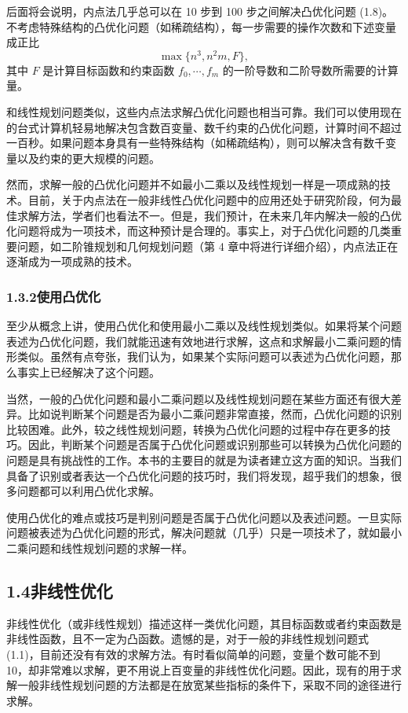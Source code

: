 \documentclass[UTF8, 12pt, fontset=fandol, oneside]{ctexart}
\begin{document}
后面将会说明，内点法几乎总可以在 10 步到 100 步之间解决凸优化问题 (1.8)。不考虑特殊结构的凸优化问题（如稀疏结构），每一步需要的操作次数和下述变量成正比
\[
  \max\{n^3,n^2m,F\},
\]
其中 $F$ 是计算目标函数和约束函数 $f_0,\cdots,f_m$ 的一阶导数和二阶导数所需要的计算量。

和线性规划问题类似，这些内点法求解凸优化问题也相当可靠。我们可以使用现在的台式计算机轻易地解决包含数百变量、数千约束的凸优化问题，计算时间不超过一百秒。如果问题本身具有一些特殊结构（如稀疏结构），则可以解决含有数千变量以及约束的更大规模的问题。

然而，求解一般的凸优化问题并不如最小二乘以及线性规划一样是一项成熟的技术。目前，关于内点法在一般非线性凸优化问题中的应用还处于研究阶段，何为最佳求解方法，学者们也看法不一。但是，我们预计，在未来几年内解决一般的凸优化问题将成为一项技术，而这种预计是合理的。事实上，对于凸优化问题的几类重要问题，如二阶锥规划和几何规划问题（第 4 章中将进行详细介绍），内点法正在逐渐成为一项成熟的技术。

\subsubsection*{1.3.2\quad 使用凸优化}

至少从概念上讲，使用凸优化和使用最小二乘以及线性规划类似。如果将某个问题表述为凸优化问题，我们就能迅速有效地进行求解，这点和求解最小二乘问题的情形类似。虽然有点夸张，我们认为，如果某个实际问题可以表述为凸优化问题，那么事实上已经解决了这个问题。

当然，一般的凸优化问题和最小二乘问题以及线性规划问题在某些方面还有很大差异。比如说判断某个问题是否为最小二乘问题非常直接，然而，凸优化问题的识别比较困难。此外，较之线性规划问题，转换为凸优化问题的过程中存在更多的技巧。因此，判断某个问题是否属于凸优化问题或识别那些可以转换为凸优化问题的问题是具有挑战性的工作。本书的主要目的就是为读者建立这方面的知识。当我们具备了识别或者表达一个凸优化问题的技巧时，我们将发现，超乎我们的想象，很多问题都可以利用凸优化求解。

使用凸优化的难点或技巧是判别问题是否属于凸优化问题以及表述问题。一旦实际问题被表述为凸优化问题的形式，解决问题就（几乎）只是一项技术了，就如最小二乘问题和线性规划问题的求解一样。

\subsection*{1.4\quad 非线性优化}

非线性优化（或非线性规划）描述这样一类优化问题，其目标函数或者约束函数是非线性函数，且不一定为凸函数。遗憾的是，对于一般的非线性规划问题式 (1.1)，目前还没有有效的求解方法。有时看似简单的问题，变量个数可能不到 10，却非常难以求解，更不用说上百变量的非线性优化问题。因此，现有的用于求解一般非线性规划问题的方法都是在放宽某些指标的条件下，采取不同的途径进行求解。
\end{document}
